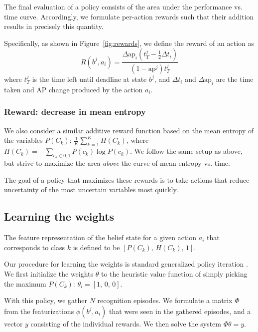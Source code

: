 The final evaluation of a policy consists of the area under the performance vs. time curve.
Accordingly, we formulate per-action rewards such that their addition results in precisely this quantity.

Specifically, as shown in Figure~\ref{fig:rewards}, we define the reward of an action as
\begin{equation}\label{eq:advanced}
R(b^j,a_i) = \frac{\Delta \text{ap}_i (t_T^j-\frac{1}{2}\Delta t_i)}{(1-\text{ap}^j)t_T^j}
\end{equation}
where $t_T^j$ is the time left until deadline at state $b^j$, and $\Delta t_i$ and $\Delta \text{ap}_i$ are the time taken and AP change produced by the action $a_i$.


\subsubsection{Reward: decrease in mean entropy}
We also consider a similar additive reward function based on the mean entropy of the variables $P(C_k)$: $\frac{1}{K}\sum_{k=1}^K H(C_k)$, where $H(C_k) = - \sum_{c_k \in {0,1}} P(c_k) \log P(c_k)$.
We follow the same setup as above, but strive to maximize the area \emph{above} the curve of mean entropy vs. time.

The goal of a policy that maximizes these rewards is to take actions that reduce uncertainty of the most uncertain variables most quickly.

\subsection{Learning the weights}

The feature representation of the belief state for a given action $a_i$ that corresponds to class $k$ is defined to be $[P(C_k), \, H(C_k), \, 1]$.

Our procedure for learning the weights is standard generalized policy iteration \cite{Sutton1998}.
We first initialize the weights $\theta$ to the heuristic value function of simply picking the maximum $P(C_k)$: $\theta_i = [1, \,0, \,0]$.

With this policy, we gather $N$ recognition episodes.
We formulate a matrix $\Phi$ from the featurizations $\phi(b^j,a_i)$ that were seen in the gathered episodes, and a vector $y$ consisting of the individual rewards.
We then solve the system $\Phi \theta = y$.



